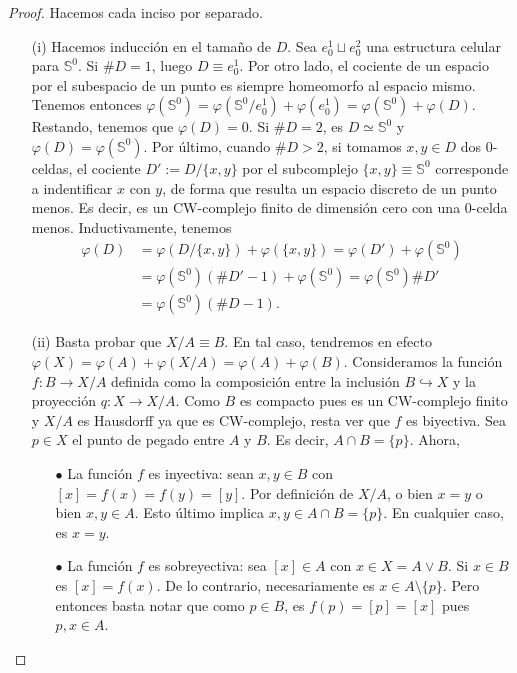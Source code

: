 \documentclass[11pt]{article}
\newcommand{\Ss}{\mathbb{S}}
\begin{document}
\begin{proof} Hacemos cada inciso por separado.
\begin{itemize}
\item[(i)] Hacemos inducci\'on en el tama\~{n}o de $D$. Sea $e^1_0 \sqcup e^2_0$ una estructura celular para $\Ss^0$. Si $\# D=1$, luego $D \equiv e^1_0$. Por otro lado, el cociente de un espacio por el subespacio de un punto es siempre homeomorfo al espacio mismo. Tenemos entonces $\varphi(\Ss^0) = \varphi(\Ss^0/e^1_0) + \varphi(e^1_0) = \varphi(\Ss^0) + \varphi(D)$. Restando, tenemos que $\varphi(D) = 0$. Si $\# D = 2$, es $D \simeq \Ss^0$ y $\varphi(D) = \varphi(\Ss^0)$. Por \'ultimo, cuando $\#D > 2$, si tomamos $x,y \in D$ dos $0$-celdas, el cociente $D' := D/\{x,y\}$ por el subcomplejo $\{x,y\} \equiv \Ss^0$ corresponde a indentificar $x$ con $y$, de forma que resulta un espacio discreto de un punto menos. Es decir, es un CW-complejo finito de dimensi\'on cero con una $0$-celda menos. Inductivamente, tenemos
\begin{align*}
\varphi(D) &= \varphi(D/\{x,y\}) + \varphi(\{x,y\}) = \varphi(D') + \varphi(\Ss^0) \\
&= \varphi(\Ss^0)(\# D'-1) + \varphi(\Ss^0) = \varphi(\Ss^0)\# D'\\
&= \varphi(\Ss^0)(\# D-1).
\end{align*}
\item[(ii)] Basta probar que $X/A \equiv B$. En tal caso, tendremos en efecto $\varphi(X) = \varphi(A) + \varphi(X/A) = \varphi(A) + \varphi(B)$. Consideramos la funci\'on $f : B \to X/A$ definida como la composici\'on entre la inclusi\'on $B \hookrightarrow X$ y la proyecci\'on $q : X \to X/A$. Como $B$ es compacto pues es un CW-complejo finito y $X/A$ es Hausdorff ya que es CW-complejo, resta ver que $f$ es biyectiva. Sea $p \in X$ el punto de pegado entre $A$ y $B$. Es decir, $A \cap B = \{p\}$. Ahora,
\begin{itemize}
\item[$\bullet$] La funci\'on $f$ es inyectiva: sean $x, y \in B$ con $[x] = f(x) = f(y) = [y]$. Por definici\'on de $X/A$, o bien $x = y$ o bien $x,y \in A$. Esto \'ultimo implica $x,y \in A \cap B = \{p\}$. En cualquier caso, es $x = y$.
\item[$\bullet$] La funci\'on $f$ es sobreyectiva: sea $[x] \in A$ con $x \in X = A \vee B$. Si $x \in B$ es $[x] = f(x)$. De lo contrario, necesariamente es $x \in A \setminus \{p\}$. Pero entonces basta notar que como $p \in B$, es $f(p) = [p] = [x]$ pues $p,x \in A$.
\end{itemize}

\end{itemize}
\end{proof}
\end{document}
